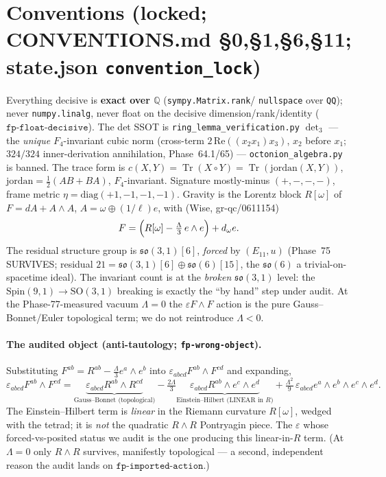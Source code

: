 \documentclass[11pt]{article}
\newcommand{\Q}{\mathbb{Q}}
\newcommand{\half}{\tfrac12}
\newcommand{\eu}{e}
\newcommand{\om}{\omega}
\newcommand{\Tr}{\operatorname{Tr}}
\newcommand{\so}{\mathfrak{so}}
\theoremstyle{definition}\newtheorem{remark}{Remark}
\theoremstyle{definition}\newtheorem{definition}{Definition}
\theoremstyle{plain}\newtheorem{proposition}{Proposition}
\theoremstyle{plain}\newtheorem{lemma}{Lemma}
\begin{document}
\section*{Conventions (locked; CONVENTIONS.md \S0,\S1,\S6,\S11; state.json \texttt{convention\_lock})}
Everything decisive is \textbf{exact over $\Q$} (\texttt{sympy.Matrix.rank}/
\texttt{nullspace} over \texttt{QQ}); never \texttt{numpy.linalg}, never float on the
decisive dimension/rank/identity ($\texttt{fp-float-decisive}$). The det SSOT is
\texttt{ring\_lemma\_verification.py} $\det\nolimits_3$ --- the \emph{unique}
$F_4$-invariant cubic norm (cross-term $2\,\mathrm{Re}((x_2x_1)x_3)$, $x_2$ before
$x_1$; $324/324$ inner-derivation annihilation, Phase~64.1/65) ---
\texttt{octonion\_algebra.py} is banned. The trace form is
$c(X,Y)=\Tr(X\circ Y)=\Tr(\mathrm{jordan}(X,Y))$, $\mathrm{jordan}=\half(AB+BA)$,
$F_4$-invariant. Signature mostly-minus $(+,-,-,-)$, frame metric
$\eta=\mathrm{diag}(+1,-1,-1,-1)$. Gravity is the Lorentz block $R[\om]$ of
$F=dA+A\wedge A$, $A=\om\oplus(1/\ell)\eu$, with (Wise, gr-qc/0611154)
\begin{equation}\label{eq:wise}
  F=\Bigl(R[\om]-\tfrac{\Lambda}{3}\,\eu\wedge \eu\Bigr)+d_\om \eu .
\end{equation}
The residual structure group is $\so(3,1)[6]$, \emph{forced} by $(E_{11},u)$
(Phase~75 SURVIVES; residual $21=\so(3,1)[6]\oplus\so(6)[15]$, the $\so(6)$ a
trivial-on-spacetime ideal). The invariant count is at the \emph{broken}
$\so(3,1)$ level: the $\mathrm{Spin}(9,1)\to\mathrm{SO}(3,1)$ breaking is exactly the
``by hand'' step under audit. At the Phase-77-measured vacuum $\Lambda=0$ the
$\varepsilon F\wedge F$ action is the pure Gauss--Bonnet/Euler topological term;
we do not reintroduce $\Lambda<0$.

\paragraph{The audited object (anti-tautology; \texttt{fp-wrong-object}).}
Substituting $F^{ab}=R^{ab}-\tfrac{\Lambda}{3}\eu^a\wedge \eu^b$ into
$\varepsilon_{abcd}F^{ab}\wedge F^{cd}$ and expanding,
\begin{equation}\label{eq:ehexpand}
  \varepsilon_{abcd}F^{ab}\wedge F^{cd}
  =\underbrace{\varepsilon_{abcd}R^{ab}\wedge R^{cd}}_{\text{Gauss--Bonnet (topological)}}
   -\tfrac{2\Lambda}{3}\underbrace{\varepsilon_{abcd}R^{ab}\wedge \eu^c\wedge \eu^d}_{\text{Einstein--Hilbert (LINEAR in }R)}
   +\tfrac{\Lambda^2}{9}\,\varepsilon_{abcd}\eu^a\wedge \eu^b\wedge \eu^c\wedge \eu^d .
\end{equation}
The Einstein--Hilbert term is \emph{linear} in the Riemann curvature $R[\om]$, wedged
with the tetrad; it is \emph{not} the quadratic $R\wedge R$ Pontryagin piece. The
$\varepsilon$ whose forced-vs-posited status we audit is the one producing this
linear-in-$R$ term. (At $\Lambda=0$ only $R\wedge R$ survives, manifestly topological
--- a second, independent reason the audit lands on $\texttt{fp-imported-action}$.)
\end{document}
